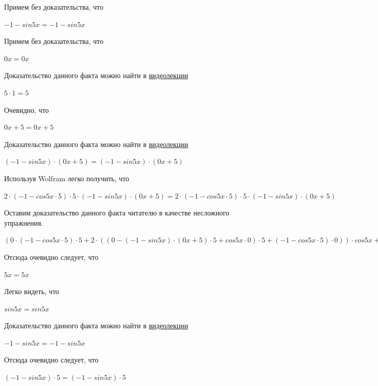 \documentclass[12pt,a4paper,fleqn]{article}
\theoremstyle{definition}
\begin{document}
Примем без доказательства, что 

$ -1  - sin 5  x  =  -1  - sin 5  x $

Примем без доказательства, что 

$ 0  x  =  0  x $

Доказательство данного факта можно найти в \href{https://www.youtube.com/watch?v=dQw4w9WgXcQ}{видеолекции} 

$ 5  \cdot  1  =  5 $

Очевидно, что 

$ 0  x  +  5  =  0  x  +  5 $

Доказательство данного факта можно найти в \href{https://www.youtube.com/watch?v=dQw4w9WgXcQ}{видеолекции} 

$( -1  - sin 5  x ) \cdot ( 0  x  +  5 ) = ( -1  - sin 5  x ) \cdot ( 0  x  +  5 )$

Используя Wolfram легко получить, что 

$ 2  \cdot ( -1  - cos 5  x  \cdot  5 ) \cdot  5  \cdot ( -1  - sin 5  x ) \cdot ( 0  x  +  5 ) =  2  \cdot ( -1  - cos 5  x  \cdot  5 ) \cdot  5  \cdot ( -1  - sin 5  x ) \cdot ( 0  x  +  5 )$

Оставим доказательство данного факта читателю в качестве несложного упражнения. 

$( 0  \cdot ( -1  - cos 5  x  \cdot  5 ) \cdot  5  +  2  \cdot (( 0  - ( -1  - sin 5  x ) \cdot ( 0  x  +  5 ) \cdot  5  + cos 5  x  \cdot  0 ) \cdot  5  + ( -1  - cos 5  x  \cdot  5 ) \cdot  0 )) \cdot cos 5  x  +  2  \cdot ( -1  - cos 5  x  \cdot  5 ) \cdot  5  \cdot ( -1  - sin 5  x ) \cdot ( 0  x  +  5 ) = ( 0  \cdot ( -1  - cos 5  x  \cdot  5 ) \cdot  5  +  2  \cdot (( 0  - ( -1  - sin 5  x ) \cdot ( 0  x  +  5 ) \cdot  5  + cos 5  x  \cdot  0 ) \cdot  5  + ( -1  - cos 5  x  \cdot  5 ) \cdot  0 )) \cdot cos 5  x  +  2  \cdot ( -1  - cos 5  x  \cdot  5 ) \cdot  5  \cdot ( -1  - sin 5  x ) \cdot ( 0  x  +  5 )$

Отсюда очевидно следует, что 

$ 5  x  =  5  x $

Легко видеть, что 

$sin 5  x  = sin 5  x $

Доказательство данного факта можно найти в \href{https://www.youtube.com/watch?v=dQw4w9WgXcQ}{видеолекции} 

$ -1  - sin 5  x  =  -1  - sin 5  x $

Отсюда очевидно следует, что 

$( -1  - sin 5  x ) \cdot  5  = ( -1  - sin 5  x ) \cdot  5 $
\end{document}
